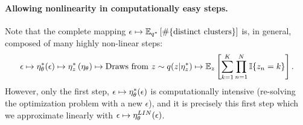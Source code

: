 \paragraph{Allowing nonlinearity in computationally easy steps.}
%
Note that the complete mapping
$\epsilon \mapsto \mathbb{E}_{q^{*}} \left[ \#\{\text{distinct clusters}\} \right]$
is, in general, composed of many highly non-linear steps:
%
\begin{align*}
\epsilon \mapsto
\eta_\theta^{*}(\epsilon) \mapsto
\eta_z^{*}\left(\eta_\theta\right) \mapsto
\textrm{Draws from }z \sim q(z \vert \eta_z^{*}) \mapsto
\mathbb{E}_z\left[\sum_{k=1}^K \prod_{n=1}^N \mathbb{I}\{z_n = k\}\right].
\end{align*}
%
However, only the first step, $\epsilon \mapsto \eta_\theta^{*}(\epsilon)$ is
computationally intensive (re-solving the optimization problem
 with a new $\epsilon$), and it is precisely this
first step which we approximate linearly with $\epsilon \mapsto
\eta_\theta^{LIN}(\epsilon)$.
